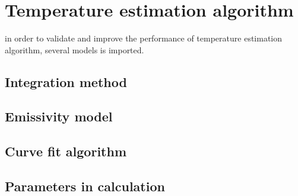 \chapter{Temperature estimation algorithm}
in order to validate and improve the performance of temperature estimation algorithm, several 
models is imported.
\section{Integration method}

\section{Emissivity model}

\section{Curve fit algorithm}

\section{Parameters in calculation}

